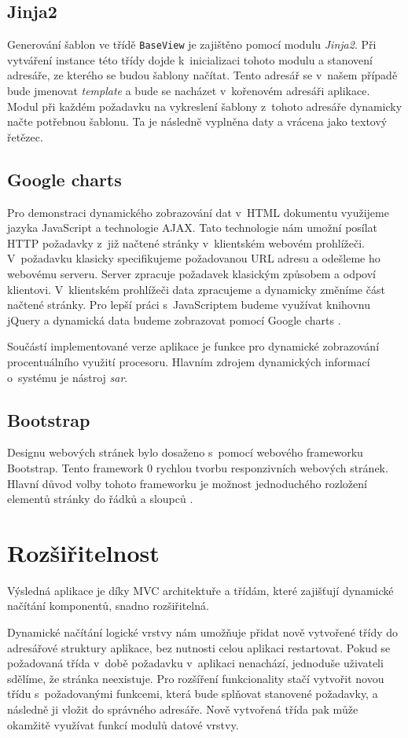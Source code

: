     \subsection{Jinja2}
    Generování šablon ve třídě \verb|BaseView| je zajištěno pomocí modulu \emph{Jinja2}. Při vytváření instance této třídy dojde k~inicializaci tohoto modulu a stanovení adresáře, ze kterého se budou šablony načítat. Tento adresář se v~našem případě bude jmenovat \emph{template} a bude se nacházet v~kořenovém adresáři aplikace. Modul při každém požadavku na vykreslení šablony z~tohoto adresáře dynamicky načte potřebnou šablonu. Ta je následně vyplněna daty a vrácena jako textový řetězec.
    \subsection{Google charts}
    Pro demonstraci dynamického zobrazování dat v~HTML dokumentu využijeme jazyka JavaScript a technologie AJAX. Tato technologie nám umožní posílat HTTP požadavky z~již načtené stránky v~klientském webovém prohlížeči. V~požadavku klasicky specifikujeme požadovanou URL adresu a odešleme ho webovému serveru. Server zpracuje požadavek klasickým způsobem a odpoví klientovi. V~klientském prohlížeči data zpracujeme a dynamicky změníme část načtené stránky. Pro lepší práci s~JavaScriptem budeme využívat knihovnu jQuery \cite{jquery} a dynamická data budeme zobrazovat pomocí Google charts \cite{google}.

    Součástí implementované verze aplikace je funkce pro dynamické zobrazování procentuálního využití procesoru. Hlavním zdrojem dynamických informací o~systému je nástroj \emph{sar}.
    \subsection{Bootstrap}
    Designu webových stránek bylo dosaženo s~pomocí webového frameworku Bootstrap. Tento framework 0 rychlou tvorbu responzivních webových stránek. Hlavní důvod volby tohoto frameworku je možnost jednoduchého rozložení elementů stránky do řádků a sloupců \cite{bootstrap}.


\section{Rozšiřitelnost}
Výsledná aplikace je díky MVC architektuře a třídám, které zajišťují dynamické načítání komponentů, snadno rozšiřitelná.

Dynamické načítání logické vrstvy nám umožňuje přidat nově vytvořené třídy do adresářové struktury aplikace, bez nutnosti celou aplikaci restartovat. Pokud se požadovaná třída v~době požadavku v~aplikaci nenachází, jednoduše uživateli sdělíme, že stránka neexistuje. Pro rozšíření funkcionality stačí vytvořit novou třídu s~požadovanými funkcemi, která bude splňovat stanovené požadavky, a následně ji vložit do správného adresáře. Nově vytvořená třída pak může okamžitě využívat funkcí modulů datové vrstvy.


